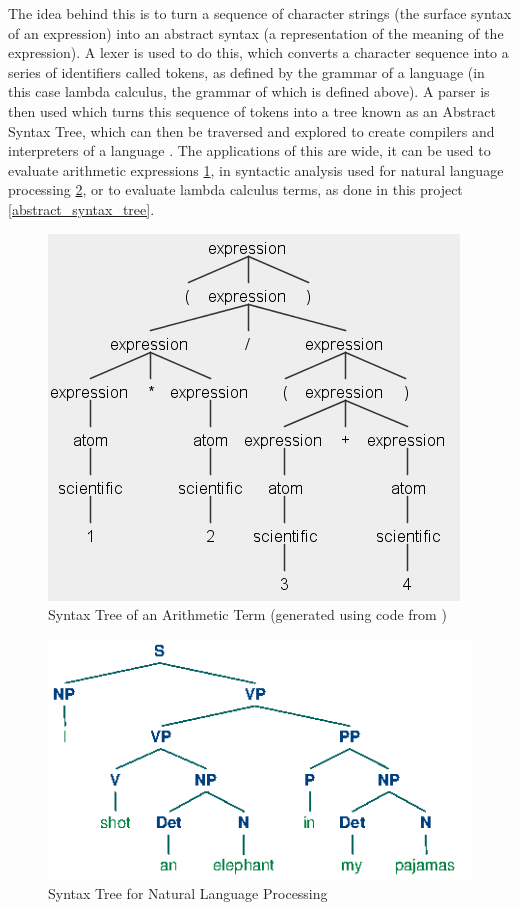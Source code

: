 \documentclass[a4paper,11pt]{report}
\begin{document}
The idea behind this is to turn a sequence of character strings (the surface syntax of an expression) into an abstract syntax (a representation of the meaning of the expression). A lexer is used to do this, which converts a character sequence into a series of identifiers called tokens, as defined by the grammar of a language (in this case lambda calculus, the grammar of which is defined above). A parser is then used which turns this sequence of tokens into a tree known as an Abstract Syntax Tree, which can then be traversed and explored to create compilers and interpreters of a language \cite{Pierce2002}. The applications of this are wide, it can be used to evaluate arithmetic expressions \ref{arithmetic_syntax_tree}, in syntactic analysis used for natural language processing \cite{Bird2009} \ref{nlp_tree}, or to evaluate lambda calculus terms, as done in this project \ref{abstract_syntax_tree}.

\begin{figure}[p]
	\centering
	\includegraphics[scale=0.75]{images/arithmetic_syntax_tree}
	\caption{Syntax Tree of an Arithmetic Term (generated using code from \protect\cite{Everett2019})}
	\label{arithmetic_syntax_tree}
\end{figure}

\begin{figure}[p]
	\centering
	\includegraphics[scale=0.75]{images/nlp_tree}
	\caption{Syntax Tree for Natural Language Processing \protect\cite{Bird2009}}
	\label{nlp_tree}
\end{figure}
\end{document}
